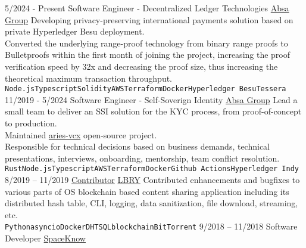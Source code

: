 \documentclass[9pt]{developercv} %
\begin{document}
\begin{entrylist}
	\entry
		{5/2024 - Present}
        {Software Engineer - Decentralized Ledger Technologies}
        {\href{https://www.absa.co.za/}{Absa Group}}
        {
          Developing privacy-preserving international payments solution based on private Hyperledger Besu deployment.\\
          Converted the underlying range-proof technology from binary range proofs to Bulletproofs within the first month of joining the project, increasing the proof verification speed by 32x and decreasing the proof size, thus increasing the theoretical maximum transaction throughput.\\
          \texttt{Node.js}\slashsep\texttt{Typescript}\slashsep\texttt{Solidity}\slashsep\texttt{AWS}\slashsep\texttt{Terraform}\slashsep\texttt{Docker}\slashsep\texttt{Hyperledger Besu}\slashsep\texttt{Tessera}
        }
	\entry
		{11/2019 - 5/2024}
        {Software Engineer - Self-Soverign Identity}
        {\href{https://www.absa.co.za/}{Absa Group}}
        {
          Lead a small team to deliver an SSI solution for the KYC process, from proof-of-concept to production.\\
          Maintained \href{https://github.com/hyperledger/aries-vcx}{aries-vcx} open-source project.\\
          Responsible for technical decisions based on business demands, technical presentations, interviews, onboarding, mentorship, team conflict resolution.\\
          \texttt{Rust}\slashsep\texttt{Node.js}\slashsep\texttt{Typescript}\slashsep\texttt{AWS}\slashsep\texttt{Terraform}\slashsep\texttt{Docker}\slashsep\texttt{Github Actions}\slashsep\texttt{Hyperledger Indy}
        }
	\entry
		{8/2019 -- 11/2019}
        {\href{https://github.com/lbryio/lbry-sdk/pulls?utf8=\%E2\%9C\%93\&q=is\%3Apr+author\%3Amirgee+}{Contributor}}
        {\href{https://github.com/lbryio/lbry-sdk/pulls?utf8=\%E2\%9C\%93\&q=is\%3Apr+author\%3Amirgee+}{LBRY}}
        {
          Contributed enhancements and bugfixes to various parts of OS blockchain based content sharing application including its distributed hash table, CLI, logging, data sanitization, file download, streaming, etc.\\
          \texttt{Python}\slashsep\texttt{asyncio}\slashsep\texttt{Docker}\slashsep\texttt{DHT}\slashsep\texttt{SQL}\slashsep\texttt{blockchain}\slashsep\texttt{BitTorrent}
        }
	\entry
		{9/2018 -- 11/2018}
		{Software Developer}
        {\href{https://spaceknow.com/}{SpaceKnow}}

\end{entrylist}
\end{document}
